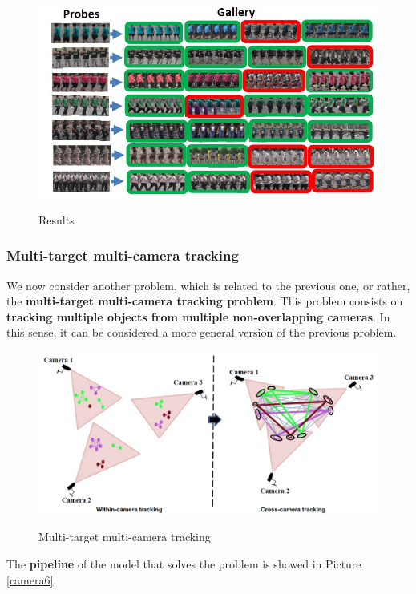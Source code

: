 \begin{figure}[h!]
    \centering
    \includegraphics[scale = 1.4]{img/camera4.jpg}
    \label{camera4}
    \caption{Results}
\end{figure}

\subsubsection{Multi-target multi-camera tracking}
We now consider another problem, which is related to the previous one, or rather, the \textbf{multi-target multi-camera tracking problem}. This problem consists on \textbf{tracking multiple objects from multiple non-overlapping cameras}. In this sense, it can be considered a more general version of the previous problem.

\begin{figure}[h!]
    \centering
    \includegraphics[scale = 1.4]{img/camera5.jpg}
    \label{camera5}
    \caption{Multi-target multi-camera tracking}
\end{figure}

The \textbf{pipeline} of the model that solves the problem is showed in Picture \ref{camera6}.

